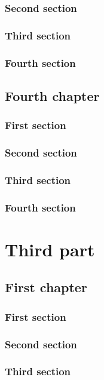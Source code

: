 \documentclass{researchbook}
\theoremstyle{plain}
\theoremstyle{definition}
\theoremstyle{remark}
\begin{document}
\section{Second section}\lipsum
\section{Third section}\lipsum
\section{Fourth section}\lipsum


\chapter{Fourth chapter}

\section{First section}\lipsum
\section{Second section}\lipsum
\section{Third section}\lipsum
\section{Fourth section}\lipsum


\part{Third part}
\chapter{First chapter}

\section{First section}\lipsum
\section{Second section}\lipsum
\section{Third section}\lipsum
\end{document}
